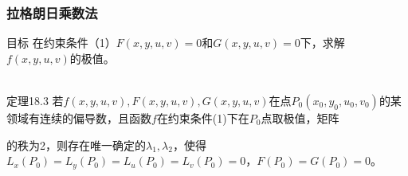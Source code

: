 \begin{frame}
    \frametitle{拉格朗日乘数法}
    
    \begin{block}{目标}
         在约束条件（1）$F(x,y,u,v)=0$和$G(x,y,u,v)=0$下，求解$f(x,y,u,v)$的极值。
    \end{block}
   ~\\
    \alert{定理18.3 }
    若$f(x,y,u,v),F(x,y,u,v),G(x,y,u,v)$在点$P_0(x_0,y_0,u_0,v_0)$的某领域有连续的偏导数，且函数$f$在约束条件(1)下在$P_0$点取极值，矩阵\\
    \begin{flushleft}
     的秩为2，则存在唯一确定的$\lambda_1,\lambda_2$，使得$L_x(P_0)=L_y(P_0)=L_u(P_0)=L_v(P_0)=0$，$F(P_0)=G(P_0)=0$。     
     \end{flushleft}
     
\end{frame}